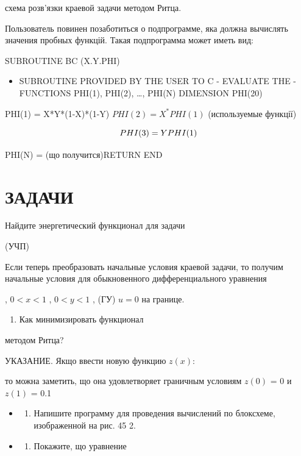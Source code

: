 \documentclass[
  ukrainian,
]{article}
\providecommand{\tightlist}{%
  \setlength{\itemsep}{0pt}\setlength{\parskip}{0pt}}
\begin{document}
схема розв'язки краевой задачи методом Ритца.

Пользователь повинен позаботиться о подпрограмме, яка должна вычислять
значения пробных функцій. Такая подпрограмма может иметь вид:

SUBROUTINE BC (X.Y.PHI)

\begin{itemize}
\tightlist
\item
  SUBROUTINE PROVIDED BY THE USER TO C - EVALUATE THE - FUNCTIONS
  PHI(1), PHI(2), \ldots, PHI(N) DIMENSION PHI(20)
\end{itemize}

PHI(1) = X*Y*(1-X)*(1-Y) \(PHI(2) = X^*PHI(1)\) (используемые функції)

\[
PHI(3) = Y\*PHI(1)
\]

PHI(N) = (що получится)RETURN END

\section{\texorpdfstring{\textbf{ЗА}ДАЧИ}{ЗАДАЧИ}}\label{ux437ux430ux434ux430ux447ux438-11}

Найдите энергетический функционал для задачи

(УЧП)

Если теперь преобразовать начальные условия краевой задачи, то получим
начальные условия для обыкновенного дифференциального уравнения

, \(0 < x < 1\) , \(0 < y < 1\) , (ГУ) \(u = 0\) на границе.

\begin{enumerate}
\def\labelenumi{\arabic{enumi}.}
\setcounter{enumi}{1}
\tightlist
\item
  Как минимизировать функционал
\end{enumerate}

методом Ритца?

УКАЗАНИЕ. Якщо ввести новую функцию \(z(x)\):

то можна заметить, що она удовлетворяет граничным условиям \(z(0)\) = 0
и \(z(1)\) = 0.1

\begin{itemize}
\tightlist
\item
  \begin{enumerate}
  \def\labelenumi{\arabic{enumi}.}
  \setcounter{enumi}{2}
  \tightlist
  \item
    Напишите программу для проведения вычислений по блоксхеме,
    изображенной на рис. 45 2.
  \end{enumerate}
\item
  \begin{enumerate}
  \def\labelenumi{\arabic{enumi}.}
  \setcounter{enumi}{3}
  \tightlist
  \item
    Покажите, що уравнение
  \end{enumerate}
\end{itemize}
\end{document}
